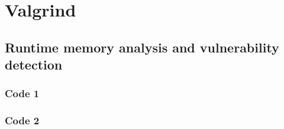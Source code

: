 
\chapter{Valgrind} %

\label{Chapitre 4.1} %




\section{Runtime memory analysis and vulnerability detection}
\subsection{Code 1}
\subsection{Code 2}

